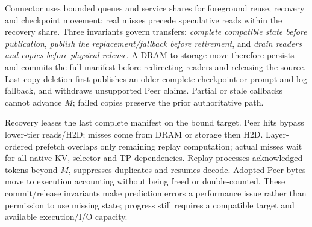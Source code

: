 Connector uses bounded queues and service shares for foreground reuse,
recovery and checkpoint movement; real misses precede speculative reads
within the recovery share. Three invariants govern transfers:
\emph{complete compatible state before publication},
\emph{publish the replacement/fallback before retirement}, and
\emph{drain readers and copies before physical release}.
A DRAM-to-storage move therefore persists and commits the full manifest
before redirecting readers and releasing the source. Last-copy deletion
first publishes an older complete checkpoint or prompt-and-log fallback,
and withdraws unsupported Peer claims. Partial or stale callbacks cannot
advance $M$; failed copies preserve the prior authoritative path.

Recovery leases the last complete manifest on the bound target. Peer hits
bypass lower-tier reads/H2D; misses come from DRAM or storage then H2D.
Layer-ordered prefetch overlaps only remaining replay computation;
actual misses wait for all native KV, selector and TP dependencies.
Replay processes acknowledged tokens beyond $M$, suppresses duplicates
and resumes decode. Adopted Peer bytes move to execution accounting
without being freed or double-counted. These commit/release invariants
make prediction errors a performance issue rather than permission to
use missing state; progress still requires a compatible target and
available execution/I/O capacity.
